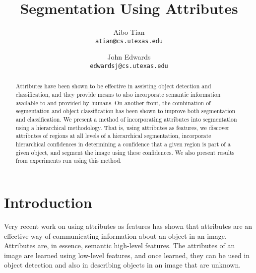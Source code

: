 \documentclass[10pt,twocolumn,letterpaper]{article}
\begin{document}
\title{Segmentation Using Attributes}

\author{Aibo Tian\\
{\tt\small atian@cs.utexas.edu}
\and
John Edwards\\
{\tt\small edwardsj@cs.utexas.edu}
}

\maketitle
\thispagestyle{empty}

\begin{abstract}
Attributes have been shown to be effective in assisting object detection and
classification, and they provide means to also incorporate semantic
information available to and provided by humans.  On another front, the
combination of segmentation and object classification has been shown to
improve both segmentation and classification.  We present a method of incorporating
attributes into segmentation using a hierarchical methodology.
That is, using attributes as features, we discover attributes of regions
at all levels of a hierarchical segmentation, 
incorporate hierarchical confidences in determining a confidence that
a given region is part of a given object, and segment the image using
these confidences.  We also present results from experiments run using
this method.
\end{abstract}

\section{Introduction}
Very recent work on using attributes as features \cite{farhadi09, lampert09}
has shown that attributes are an effective way of communicating information
about an object in an image.  Attributes are, in essence, semantic high-level
features.  The attributes of an image are learned using low-level features,
and once learned, they can be used in object detection and also in describing
objects in an image that are unknown.
\end{document}
